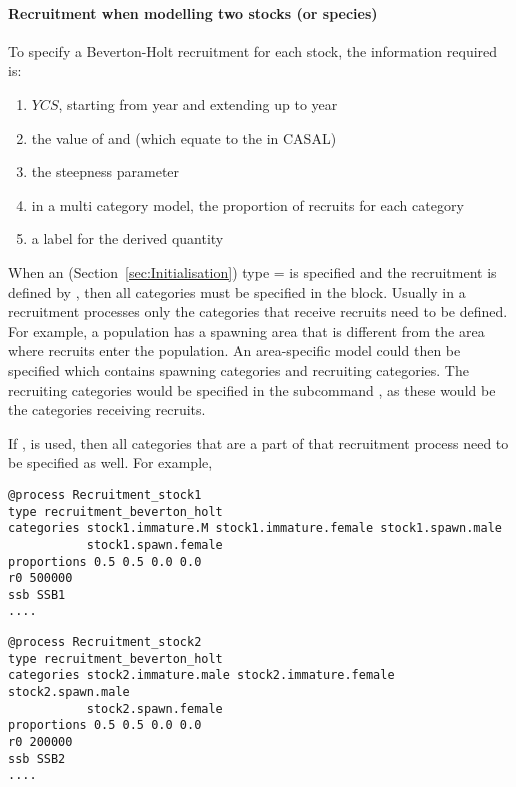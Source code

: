 \paragraph*{Recruitment when modelling two stocks (or species)}

To specify a Beverton-Holt recruitment for each stock, the information required is:

\begin{enumerate}
	\item $YCS$, starting from year  and extending up to year 
	\item the value of  and  (which equate to the  in CASAL)
	\item the steepness parameter 
	\item in a multi category model, the proportion of recruits for each category
	\item a label for the derived quantity
\end{enumerate}

When an  (Section~\ref{sec:Initialisation}) type =  is specified and the recruitment is defined by , then all categories must be specified in the  block. Usually in a recruitment processes only the categories that receive recruits need to be defined. For example, a population has a spawning area that is different from the area where recruits enter the population. An area-specific model could then be specified which contains spawning categories and recruiting categories. The recruiting categories would be specified in the subcommand , as these would be the categories receiving recruits.

If ,  is used, then all categories that are a part of that recruitment process need to be specified as well. For example,

{\small{\begin{verbatim}
@process Recruitment_stock1
type recruitment_beverton_holt
categories stock1.immature.M stock1.immature.female stock1.spawn.male
           stock1.spawn.female
proportions 0.5 0.5 0.0 0.0
r0 500000
ssb SSB1
....
\end{verbatim}}}

{\small{\begin{verbatim}
@process Recruitment_stock2
type recruitment_beverton_holt
categories stock2.immature.male stock2.immature.female stock2.spawn.male 
           stock2.spawn.female
proportions 0.5 0.5 0.0 0.0
r0 200000
ssb SSB2
....
\end{verbatim}}}

